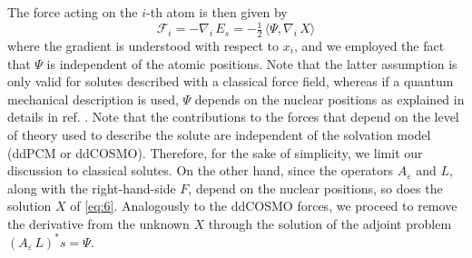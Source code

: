 \documentclass[aip,jcp,a4paper,11pt]{revtex4-1}
\newcommand{\cS}{\mathcal{S}}
\newcommand{\nablai}{\nabla_{\!i}\,}
\begin{document}

The force acting on the $i$-th atom is then given by
\[
\mathcal{F}_i = -\nablai E_s = - \tfrac{1}{2} 
\,  \langle \Psi, \nablai X \rangle 
\]
where the gradient is understood with respect to $x_i$, and we employed the fact that $\Psi$ is independent of the atomic positions. 
\color{red}Note that the latter assumption is only valid for solutes described with a classical force field, whereas if a quantum mechanical description is used, $\Psi$ depends on the nuclear positions as explained in details in ref. . Note that the contributions to the forces that depend on the level of theory used to describe the solute are independent of the solvation model (ddPCM or ddCOSMO). Therefore, for the sake of simplicity, we limit our discussion to classical solutes. \color{black}
On the other hand, since the operators $A_\varepsilon$ and $L$, along with the right-hand-side $F$, depend on the nuclear positions, so does the solution $X$ of \eqref{eq:6}. Analogously to the ddCOSMO forces, we proceed to remove the derivative from the unknown $X$ through the solution of the adjoint problem $(A_\varepsilon \, L)^* s = \Psi$.
\end{document}

